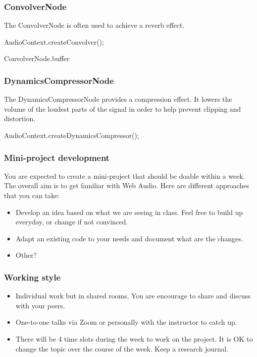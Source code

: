 \documentclass[screen, aspectratio=43]{beamer}
\begin{document}
%
\begin{frame}
\frametitle{ConvolverNode}
The \textrm{ConvolverNode} is often used to achieve a reverb effect.\\
\vspace{10 mm}
\centerline{\textrm{AudioContext.createConvolver();}}
\vspace{2 mm}
\centerline{\textrm{ConvolverNode.buffer}}
\vspace{10 mm}
\end{frame}
%
\begin{frame}
\frametitle{DynamicsCompressorNode}
The \textrm{DynamicsCompressorNode} provides a compression effect. It lowers the volume of the loudest parts of the signal in order to help prevent clipping and distortion.\\
\vspace{10 mm}
\centerline{\textrm{AudioContext.createDynamicsCompressor();}}
\vspace{10 mm}
\end{frame}
%
\begin{frame}
\frametitle{Mini-project development}
You are expected to create a mini-project that should be doable within a week. The overall aim is to get familiar with Web Audio. Here are different approaches that you can take:
\begin{itemize}
\item Develop an idea based on what we are seeing in class. Feel free to build up everyday, or change if not convinced.
\item Adapt an existing code to your needs and document what are the changes.
\item Other?
\end{itemize}
\end{frame}
%
\begin{frame}
\frametitle{Working style}
\begin{itemize}
\item Individual work but in shared rooms. You are encourage to share and discuss with your peers.
\item One-to-one talks via Zoom or personally with the instructor to catch up.
\item There will be 4 time slots during the week to work on the project. It is OK to change the topic over the course of the week. Keep a research journal.
\end{itemize}
\end{frame}
\end{document}
